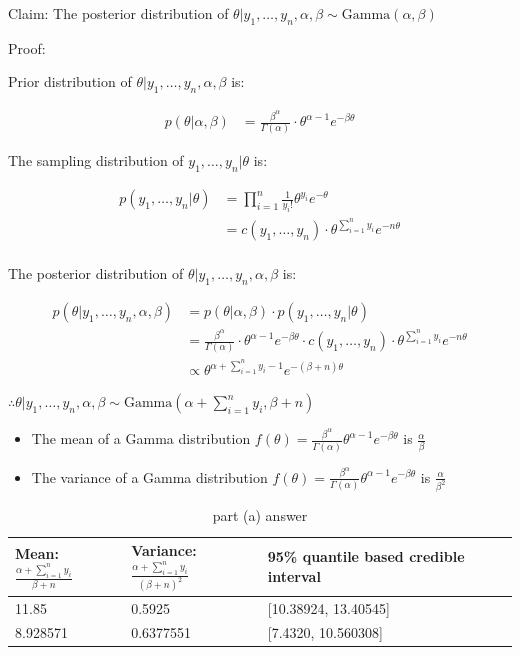 \documentclass[11pt]{article}
\begin{document}
Claim: The posterior distribution of $\theta|y_1,\ldots,y_n,\alpha, \beta \sim \text{Gamma}\left( \alpha, \beta \right) $ 

Proof:

Prior distribution of $\theta|y_1,\ldots,y_n,\alpha, \beta$ is: 

\begin{align*}
p(\theta|\alpha, \beta)
&= \frac{\beta^\alpha}{\Gamma(\alpha)}\cdot \theta^{\alpha-1}e^{-\beta\theta}
\end{align*}

The sampling distribution of $y_1,\ldots,y_n|\theta$ is:

\begin{align*}
p(y_1,\ldots,y_n|\theta)
&=\prod_{i=1}^{n} \frac{1}{y_i!}\theta^{y_i}e^{-\theta}\\
&=c(y_1,\ldots,y_n)\cdot \theta^{\sum_{i=1}^{n} y_i}e^{-n\theta}\\
\end{align*}

The posterior distribution of $\theta|y_1,\ldots,y_n, \alpha, \beta$ is:

\begin{align*}
p(\theta|y_1,\ldots,y_n, \alpha, \beta)
&=p(\theta|\alpha, \beta)\cdot p(y_1,\ldots,y_n|\theta)\\
&=\frac{\beta^\alpha}{\Gamma(\alpha)}\cdot \theta^{\alpha-1}e^{-\beta\theta}\cdot c(y_1,\ldots,y_n)\cdot \theta^{\sum_{i=1}^{n} y_i}e^{-n\theta}\\
&\propto \theta^{\alpha+\sum_{i=1}^{n} y_i -1}e^{-(\beta+n)\theta}
\end{align*}

$\therefore \theta|y_1,\ldots,y_n, \alpha, \beta \sim \text{Gamma}(\alpha+\sum_{i=1}^{n} y_i, \beta+n)$

\begin{itemize}
\item The mean of a Gamma distribution $f(\theta) = \frac{\beta^{\alpha}}{\Gamma(\alpha)}\theta^{\alpha-1}e^{-\beta \theta}$ is $\frac{\alpha}{\beta}$
\item The variance of a Gamma distribution $f(\theta) = \frac{\beta^{\alpha}}{\Gamma(\alpha)}\theta^{\alpha-1}e^{-\beta \theta}$ is $\frac{\alpha}{\beta^2}$
\end{itemize}

\begin{table}[htpb]
	\centering
	\caption{part (a) answer}
	\label{tab:label}
	\begin{tabular}{lll}
	\toprule
	Mean: $\frac{\alpha+\sum_{i=1}^{n} y_i}{\beta+n}$  & Variance: $\frac{\alpha+\sum_{i=1}^{n} y_i}{(\beta+n)^2}$ & 95\% quantile based credible interval\\
	\midrule
	11.85& 0.5925& [10.38924, 13.40545]\\
	8.928571&0.6377551&[7.4320, 10.560308]\\
	\bottomrule
	\end{tabular}
\end{table}
\end{document}
